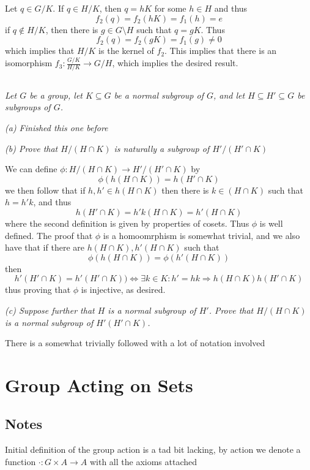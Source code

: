 \documentclass[11pt,oneside,titlepage]{book}
\DeclareMathOperator \lra {\Leftrightarrow}
\DeclareMathOperator \ra {\Rightarrow}
\begin{document}
Let $q \in G/K$.  If $q \in H/K$, then $q = hK$ for some $h \in H$ and thus
$$f_2(q) = f_2(hK) = f_1(h) = e$$
if $q \notin H/K$, then there is $g \in G \setminus H$ such that $q = gK$. Thus
$$f_2(q) = f_2(gK) = f_1(g) \neq 0$$
which implies that $H/K$ is the kernel of $f_2$. This implies that
there is an isomorphism $f_3: \frac{G/K}{H/K} \to G/H$, which implies
the desired result.

\subsection{}

\textit{Let $G$ be a group, let $K \subseteq G$ be a normal subgroup of $G$, and
  let $H \subseteq H' \subseteq G$ be subgroups
  of $G$.}

\textit{(a) Finished this one before}

\textit{(b) Prove that $H/(H \cap K)$ is naturally a subgroup of $H'/(H' \cap K)$}

We can define $\phi: H/(H \cap K) \to H'/(H' \cap K)$ by
$$\phi(h(H \cap K)) = h(H' \cap K)$$
we then follow that if $h, h' \in h(H \cap K)$ then there is $k \in (H
\cap K)$ such that $h = h'k$, and thus
$$h(H' \cap K) = h'k(H \cap K) = h'(H \cap K)$$
where the second definition is given by properties of cosets. Thus
$\phi$ is well defined. The proof that $\phi$ is a homoomrphism is
somewhat trivial, and we also have that if there are $h(H \cap K), h'(H \cap K)$
such that
$$\phi(h(H \cap K)) = \phi(h'(H \cap K))$$
then
$$h'(H' \cap K) = h'(H' \cap K)) \lra
\exists k \in K: h' = hk \ra h(H \cap K) h(H' \cap K)$$
thus proving  that $\phi$ is injective, as desired.

\textit{(c) Suppose further that $H$ is a normal subgroup of $H'$. Prove that
$H/(H \cap K)$ is a normal subgroup of $H'(H' \cap K)$.}

There is a somewhat trivially followed with a lot of notation involved

\section{Group Acting on Sets}

\subsection*{Notes}

Initial definition of the group action is a tad bit lacking, by action
we denote a function $\cdot: G \times A \to A$ with all the axioms
attached
\end{document}
